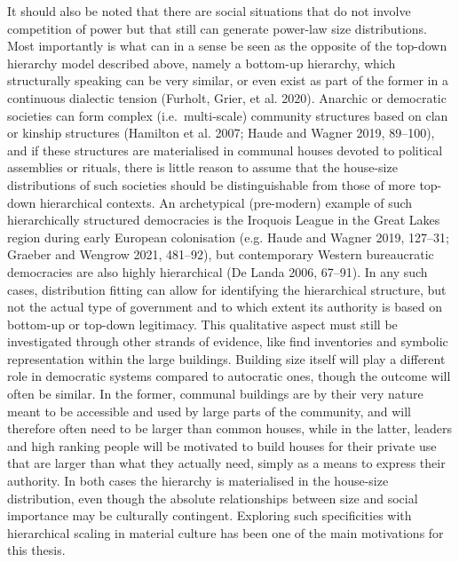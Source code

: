\documentclass[
  12pt,
  a4paper, twoside]{book}
\begin{document}
It should also be noted that there are social situations that do not involve competition of power but that still can generate power-law size distributions. Most importantly is what can in a sense be seen as the opposite of the top-down hierarchy model described above, namely a bottom-up hierarchy, which structurally speaking can be very similar, or even exist as part of the former in a continuous dialectic tension (Furholt, Grier, et al. 2020). Anarchic or democratic societies can form complex (i.e.~multi-scale) community structures based on clan or kinship structures (Hamilton et al. 2007; Haude and Wagner 2019, 89--100), and if these structures are materialised in communal houses devoted to political assemblies or rituals, there is little reason to assume that the house-size distributions of such societies should be distinguishable from those of more top-down hierarchical contexts. An archetypical (pre-modern) example of such hierarchically structured democracies is the Iroquois League in the Great Lakes region during early European colonisation (e.g. Haude and Wagner 2019, 127--31; Graeber and Wengrow 2021, 481--92), but contemporary Western bureaucratic democracies are also highly hierarchical (De Landa 2006, 67--91). In any such cases, distribution fitting can allow for identifying the hierarchical structure, but not the actual type of government and to which extent its authority is based on bottom-up or top-down legitimacy. This qualitative aspect must still be investigated through other strands of evidence, like find inventories and symbolic representation within the large buildings. Building size itself will play a different role in democratic systems compared to autocratic ones, though the outcome will often be similar. In the former, communal buildings are by their very nature meant to be accessible and used by large parts of the community, and will therefore often need to be larger than common houses, while in the latter, leaders and high ranking people will be motivated to build houses for their private use that are larger than what they actually need, simply as a means to express their authority. In both cases the hierarchy is materialised in the house-size distribution, even though the absolute relationships between size and social importance may be culturally contingent. Exploring such specificities with hierarchical scaling in material culture has been one of the main motivations for this thesis.
\end{document}
